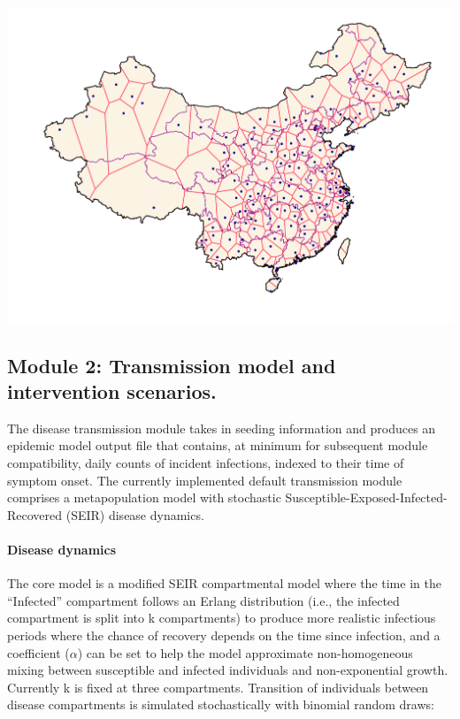  \begin{marginfigure}[-2\baselineskip]
\centering
\includegraphics{fig_pipeline/airport_tessellation.pdf}
\label{fig:rain}
\end{marginfigure}

\subsection{Module 2: Transmission model and intervention scenarios.}
The disease transmission module takes in seeding information and produces an epidemic model output file that contains, at minimum for subsequent module compatibility, daily counts of incident infections, indexed to their time of symptom onset. The currently implemented default transmission module comprises a metapopulation model with stochastic Susceptible-Exposed-Infected-Recovered (SEIR) disease dynamics.

\paragraph{Disease dynamics} The core model is a modified SEIR compartmental model where the time in the “Infected” compartment follows an Erlang distribution (i.e., the infected compartment is split into k compartments) to produce more realistic infectious periods where the chance of recovery depends on the time since infection\cite{Yan:QuantitativeMethodsInvestigating:2019}, and a coefficient ($\alpha$) can be set to help the model approximate non-homogeneous mixing between susceptible and infected individuals and non-exponential growth\cite{Finkenstadt:StochasticModelExtinction:2002}. Currently k is fixed at three compartments. Transition of individuals between disease compartments is simulated stochastically with binomial random draws:

